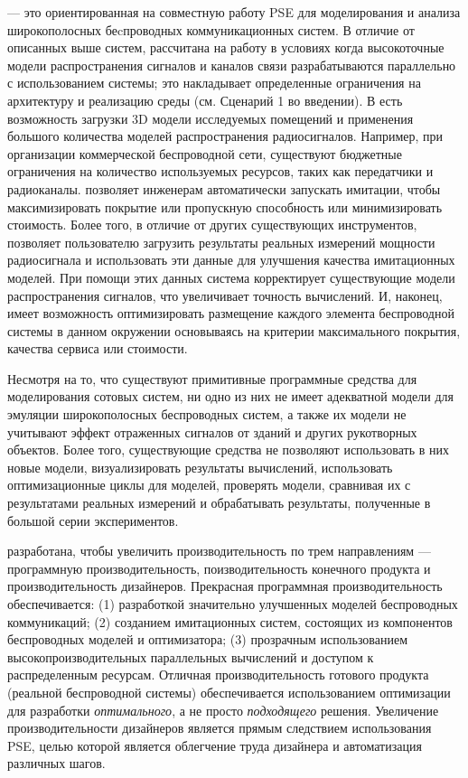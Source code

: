 \SW --- это ориентированная на совместную работу PSE для моделирования и анализа широкополосных беcпроводных коммуникационных систем. В отличие от описанных выше систем, \SW рассчитана на работу в условиях когда высокоточные модели распространения сигналов и каналов связи разрабатываются параллельно с использованием системы; это накладывает определенные ограничения на архитектуру и реализацию среды (см. Сценарий 1 во введении). В \SW есть возможность загрузки 3D модели исследуемых помещений и применения большого количества моделей распространения радиосигналов. Например, при организации коммерческой беспроводной сети, существуют бюджетные ограничения на количество используемых ресурсов, таких как передатчики и радиоканалы. \SW позволяет инженерам автоматически запускать имитации, чтобы максимизировать покрытие или пропускную способность или минимизировать стоимость. Более того, в отличие от других существующих инструментов, \SW позволяет пользователю загрузить результаты реальных измерений мощности радиосигнала и использовать эти данные для улучшения качества имитационных моделей. При помощи этих данных система корректирует существующие модели распространения сигналов, что увеличивает точность вычислений. И, наконец, \SW имеет возможность оптимизировать размещение каждого элемента беспроводной системы в данном окружении основываясь на критерии максимального покрытия, качества сервиса или стоимости.

Несмотря на то, что существуют примитивные программные средства для моделирования сотовых систем, ни одно из них не имеет адекватной модели для эмуляции широкополосных беспроводных систем, а также их модели не учитывают эффект отраженных сигналов от зданий и других рукотворных объектов. Более того, существующие средства не позволяют использовать в них новые модели, визуализировать результаты вычислений, использовать оптимизационные циклы для моделей, проверять модели, сравнивая их с результатами реальных измерений и обрабатывать результаты, полученные в большой серии экспериментов. 

\SW разработана, чтобы увеличить производительность по трем направлениям --- программную производительность, поизводительность конечного продукта и производительность дизайнеров. Прекрасная программная производительность обеспечивается: (1) разработкой значительно улучшенных моделей беспроводных коммуникаций; (2) созданием имитационных систем, состоящих из компонентов беспроводных моделей и оптимизатора; (3) прозрачным использованием высокопроизводительных параллельных вычислений и доступом к распределенным ресурсам. Отличная производительность готового продукта (реальной беспроводной системы) обеспечивается использованием оптимизации для разработки \emph{оптимального}, а не просто \emph{подходящего} решения. Увеличение производительности дизайнеров является прямым следствием использования PSE, целью которой является облегчение труда дизайнера и автоматизация различных шагов.

